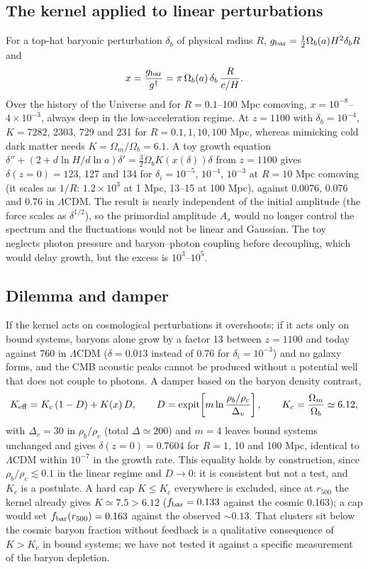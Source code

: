 \documentclass[11pt,a4paper]{article}
\newcommand{\gdag}{g^{\dagger}}
\newcommand{\fbar}{f_{\rm bar}}
\begin{document}
\subsection{The kernel applied to linear perturbations}
For a top-hat baryonic perturbation $\delta_b$ of physical radius $R$, $g_{\rm bar}=\tfrac12\Omega_b(a)H^2\delta_bR$ and
\begin{equation}
x=\frac{g_{\rm bar}}{\gdag}=\pi\,\Omega_b(a)\,\delta_b\,\frac{R}{c/H}.
\end{equation}
Over the history of the Universe and for $R=0.1$--100 Mpc comoving, $x=10^{-8}$--$4\times10^{-3}$, always deep in the low-acceleration regime. At $z=1100$ with $\delta_b=10^{-4}$, $K=7282$, 2303, 729 and 231 for $R=0.1,1,10,100$ Mpc, whereas mimicking cold dark matter needs $K=\Omega_m/\Omega_b=6.1$. A toy growth equation $\delta''+(2+d\ln H/d\ln a)\delta'=\tfrac32\Omega_b K(x(\delta))\delta$ from $z=1100$ gives $\delta(z=0)=123$, 127 and 134 for $\delta_i=10^{-5}$, $10^{-4}$, $10^{-3}$ at $R=10$ Mpc comoving (it scales as $1/R$: $1.2\times10^3$ at 1 Mpc, 13--15 at 100 Mpc), against 0.0076, 0.076 and 0.76 in $\Lambda$CDM. The result is nearly independent of the initial amplitude (the force scales as $\delta^{1/2}$), so the primordial amplitude $A_s$ would no longer control the spectrum and the fluctuations would not be linear and Gaussian. The toy neglects photon pressure and baryon--photon coupling before decoupling, which would delay growth, but the excess is $10^3$--$10^5$.

\subsection{Dilemma and damper}
If the kernel acts on cosmological perturbations it overshoots; if it acts only on bound systems, baryons alone grow by a factor 13 between $z=1100$ and today against 760 in $\Lambda$CDM ($\delta=0.013$ instead of 0.76 for $\delta_i=10^{-3}$) and no galaxy forms, and the CMB acoustic peaks cannot be produced without a potential well that does not couple to photons. A damper based on the baryon density contrast,
\begin{equation}
K_{\rm eff}=K_c\,(1-D)+K(x)\,D,\qquad D={\rm expit}\!\left[m\ln\frac{\rho_b/\rho_c}{\Delta_v}\right],\qquad K_c=\frac{\Omega_m}{\Omega_b}\simeq6.12,
\label{eq:damper}
\end{equation}
with $\Delta_v=30$ in $\rho_b/\rho_c$ (total $\Delta\simeq200$) and $m=4$ leaves bound systems unchanged and gives $\delta(z=0)=0.7604$ for $R=1$, 10 and 100 Mpc, identical to $\Lambda$CDM within $10^{-7}$ in the growth rate. This equality holds by construction, since $\rho_b/\rho_c\lesssim0.1$ in the linear regime and $D\to0$: it is consistent but not a test, and $K_c$ is a postulate. A hard cap $K\le K_c$ everywhere is excluded, since at $r_{500}$ the kernel already gives $K\simeq7.5>6.12$ ($\fbar=0.133$ against the cosmic 0.163); a cap would set $\fbar(r_{500})=0.163$ against the observed $\sim0.13$. That clusters sit below the cosmic baryon fraction without feedback is a qualitative consequence of $K>K_c$ in bound systems; we have not tested it against a specific measurement of the baryon depletion.
\end{document}

